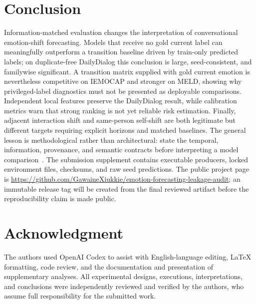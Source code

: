 \documentclass{ieeeaccess}
\begin{document}
\vspace{-3mm}\section{Conclusion}

Information-matched evaluation changes the interpretation of conversational emotion-shift
forecasting. Models that receive no gold current label can meaningfully outperform a transition
baseline driven by train-only predicted labels; on duplicate-free DailyDialog this conclusion is
large, seed-consistent, and familywise significant. A transition matrix supplied with gold current
emotion is nevertheless competitive on IEMOCAP and stronger on MELD, showing why privileged-label
diagnostics must not be presented as deployable comparisons. Independent local features preserve
the DailyDialog result, while calibration metrics warn that strong ranking is not yet reliable risk
estimation. Finally, adjacent interaction shift and same-person self-shift are both legitimate but
different targets requiring explicit horizons and matched baselines. The general lesson is
methodological rather than architectural: state the temporal, information, provenance, and semantic
contracts before interpreting a model comparison~\cite{kapoor2023leakage,dacrema2019recsys,lin2019neuralhype}.
The submission supplement contains executable producers, locked environment files, checksums, and
raw seed predictions. The public project page is
\url{https://github.com/GawaineXiukkie/emotion-forecasting-leakage-audit}; an immutable release tag
will be created from the final reviewed artifact before the reproducibility claim is made public.

\section*{Acknowledgment}

The authors used OpenAI Codex to assist with English-language editing, LaTeX formatting, code
review, and the documentation and presentation of supplementary analyses. All experimental
designs, executions, interpretations, and conclusions were independently reviewed and verified
by the authors, who assume full responsibility for the submitted work.
\end{document}
